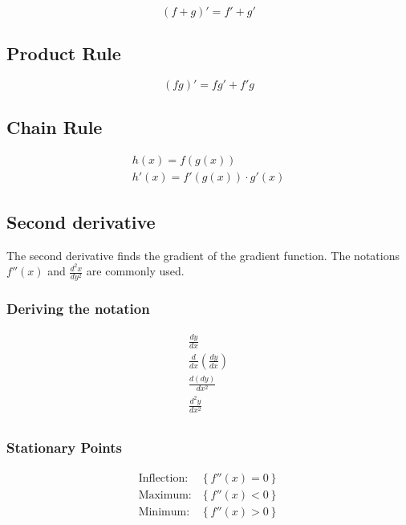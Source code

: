 \documentclass{article}
\begin{document}
\begin{equation}
	(f + g)' = f' + g'
\end{equation}

\subsection{Product Rule}

\begin{equation}
	(fg)' = fg' + f'g
\end{equation}

\subsection{Chain Rule}

\begin{gather}
	h(x) = f(g(x))\\
	h'(x) = f'(g(x)) \cdot g'(x) 
\end{gather}

\subsection{Second derivative}

The second derivative finds the gradient of the gradient function. The notations $f''(x)$ and $\frac{d^2x}{dy^2}$ are commonly used.

\subsubsection{Deriving the notation}

\begin{gather}
	\frac{dy}{dx} \\
	\frac{d}{dx} \left ( \frac{dy}{dx} \right )\\
	\frac{d(dy)}{dx^2} \\
	\frac{d^2y}{dx^2} \\
\end{gather}

\subsubsection{Stationary Points}

\begin{align*}
	\text{Inflection:} &\left \{ f''(x) = 0 \right \} \\
	\text{Maximum:} &\left \{ f''(x) < 0 \right \} \\
	\text{Minimum:} &\left \{ f''(x) > 0 \right \} \\
\end{align*}
\end{document}
